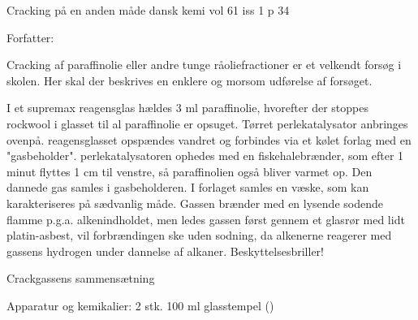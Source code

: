 
Cracking på en anden måde
dansk kemi vol 61 iss 1 p 34



Forfatter:

Cracking af paraffinolie eller andre tunge råoliefractioner er et velkendt
forsøg i skolen. Her skal der beskrives en enklere og morsom udførelse af
forsøget.

I et supremax reagensglas hældes 3 ml paraffinolie, hvorefter der stoppes
rockwool i glasset til al paraffinolie er opsuget. Tørret perlekatalysator
anbringes ovenpå. reagensglasset opspændes vandret og forbindes via et kølet
forlag med en "gasbeholder". perlekatalysatoren ophedes med en fiskehalebrænder,
som efter 1 minut flyttes 1 cm til venstre, så paraffinolien også bliver varmet
op. Den dannede gas samles i gasbeholderen. I forlaget samles en væske, som kan
karakteriseres på sædvanlig måde. Gassen brænder med en lysende sodende flamme
p.g.a. alkenindholdet, men ledes gassen først gennem et glasrør med lidt
platin-asbest, vil forbrændingen ske uden sodning, da alkenerne reagerer med
gassens hydrogen under dannelse af alkaner. Beskyttelsesbriller!

Crackgassens sammensætning

Apparatur og kemikalier: 2 stk. 100 ml glasstempel ()
